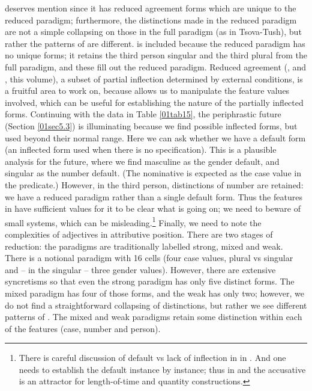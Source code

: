 \documentclass[output=paper,colorlinks,citecolor=brown]{langscibook}
\begin{document}
\largerpage
{} deserves mention since it has reduced agreement forms which are unique to the reduced paradigm; furthermore, the distinctions made in the reduced paradigm are not a simple collapsing on those in the full paradigm (as in Tsova-Tush), but rather the patterns of  are different.  is included because the reduced paradigm has no unique forms; it retains the third person singular and the third plural from the full paradigm, and these fill out the reduced paradigm. Reduced agreement (\citealt{feddenpaciaroni2022}, and \citeauthor{loporcaro2025}, this volume), a subset of partial inflection determined by external conditions, is a fruitful area to work on, because  allows us to manipulate the feature values involved, which can be useful for establishing the nature of the partially inflected forms. Continuing with the data in Table \ref{01tab15}, the  periphrastic future (Section \ref{01sec5.3}) is illuminating because we find possible inflected forms, but used beyond their normal range. Here we can ask whether we have a default form (an inflected form used when there is no specification). This is a plausible analysis for the  future, where we find masculine as the gender default, and singular as the number default. (The nominative is expected as the case value in the predicate.) However, in the third person, distinctions of number are retained: we have a reduced paradigm rather than a single default form. Thus the features in  have sufficient values for it to be clear what is going on; we need to beware of small systems, which can be misleading.\footnote{There is careful discussion of default  vs lack of  inflection in  in \citet[383--387, 403-404, 408-412]{arkadiev2020}. And one needs to establish the default instance by instance; thus in  \citep[329, 374]{browne1993-serbocroat} and  the accusative is an attractor for length-of-time and quantity constructions.} Finally, we need to note the complexities of  adjectives in attributive position. There are two stages of reduction: the paradigms are traditionally labelled strong, mixed and weak. There is a notional paradigm with 16 cells (four case values, plural vs singular and -- in the singular -- three gender values). However, there are extensive syncretisms so that even the strong paradigm has only five distinct forms. The mixed paradigm has four of those forms, and the weak has only two; however, we do not find a straightforward collapsing of distinctions, but rather we see different patterns of . The mixed and weak paradigms retain some distinction within each of the features (case, number and person).
\end{document}
